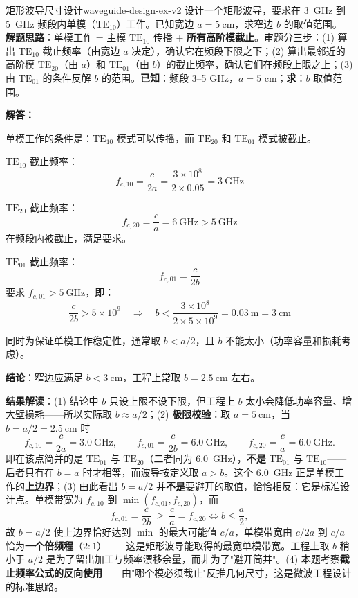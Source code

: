 \documentclass[11pt,a4paper,openany,oneside]{book}
\newcommand{\difficulty}[1]{\marginnote{\textcolor{red}{\textbf{[#1]}}}}
\begin{document}
\begin{example}{矩形波导尺寸设计}{waveguide-design-ex-v2}
\difficulty{提高}
设计一个矩形波导，要求在 \SI{3}{\giga\hertz} 到 \SI{5}{\giga\hertz} 频段内单模（$\text{TE}_{10}$）工作。已知宽边 $a = \SI{5}{\cm}$，求窄边 $b$ 的取值范围。
\tcblower
\textbf{解题思路}：单模工作 = 主模 $\text{TE}_{10}$ 传播 + \textbf{所有高阶模截止}。审题分三步：(1) 算出 $\text{TE}_{10}$ 截止频率（由宽边 $a$ 决定），确认它在频段下限之下；(2) 算出最邻近的高阶模 $\text{TE}_{20}$（由 $a$）和 $\text{TE}_{01}$（由 $b$）的截止频率，确认它们在频段上限之上；(3) 由 $\text{TE}_{01}$ 的条件反解 $b$ 的范围。\textbf{已知}：频段 3--5 GHz，$a = 5$ cm；\textbf{求}：$b$ 取值范围。

\textbf{解答：}

单模工作的条件是：$\text{TE}_{10}$ 模式可以传播，而 $\text{TE}_{20}$ 和 $\text{TE}_{01}$ 模式被截止。

$\text{TE}_{10}$ 截止频率：
\[
f_{c,10} = \frac{c}{2a} = \frac{3\times 10^8}{2\times 0.05} = \SI{3}{\giga\hertz}
\]

$\text{TE}_{20}$ 截止频率：
\[
f_{c,20} = \frac{c}{a} = \SI{6}{\giga\hertz} > \SI{5}{\giga\hertz}
\]
在频段内被截止，满足要求。

$\text{TE}_{01}$ 截止频率：
\[
f_{c,01} = \frac{c}{2b}
\]
要求 $f_{c,01} > \SI{5}{\giga\hertz}$，即：
\[
\frac{c}{2b} > 5\times 10^9 \quad\Rightarrow\quad b < \frac{3\times 10^8}{2\times 5\times 10^9} = \SI{0.03}{\m} = \SI{3}{\cm}
\]

同时为保证单模工作稳定性，通常取 $b < a/2$，且 $b$ 不能太小（功率容量和损耗考虑）。

\textbf{结论}：窄边应满足 $b < \SI{3}{\cm}$，工程上常取 $b = \SI{2.5}{\cm}$ 左右。

\textbf{结果解读}：(1) 结论中 $b$ 只设上限不设下限，但工程上 $b$ 太小会降低功率容量、增大壁损耗——所以实际取 $b\approx a/2$；(2) \textbf{极限校验}：取 $a=\SI{5}{\cm}$，当 $b = a/2 = \SI{2.5}{\cm}$ 时
\[
f_{c,10} = \frac{c}{2a} = \SI{3.0}{\GHz},\qquad
f_{c,01} = \frac{c}{2b} = \SI{6.0}{\GHz},\qquad
f_{c,20} = \frac{c}{a} = \SI{6.0}{\GHz}.
\]
即在该点简并的是 $\text{TE}_{01}$ 与 $\text{TE}_{20}$（二者同为 \SI{6.0}{\GHz}），\textbf{不是} $\text{TE}_{01}$ 与 $\text{TE}_{10}$——后者只有在 $b=a$ 时才相等，而波导按定义取 $a>b$。这个 \SI{6.0}{\GHz} 正是单模工作的\textbf{上边界}；(3) 由此看出 $b = a/2$ 并\textbf{不是}要避开的取值，恰恰相反：它是标准设计点。单模带宽为 $f_{c,10}$ 到 $\min(f_{c,01},f_{c,20})$，而
\[
f_{c,01}=\frac{c}{2b}\ \ge\ \frac{c}{a}=f_{c,20}
\iff b \le \frac{a}{2},
\]
故 $b = a/2$ 使上边界恰好达到 $\min$ 的最大可能值 $c/a$，单模带宽由 $c/2a$ 到 $c/a$ 恰为\textbf{一个倍频程}（$2:1$）——这是矩形波导能取得的最宽单模带宽。工程上取 $b$ 稍小于 $a/2$ 是为了留出加工与频率漂移余量，而非为了"避开简并"。(4) 本题考察\textbf{截止频率公式的反向使用}——由"哪个模必须截止"反推几何尺寸，这是微波工程设计的标准思路。


\end{example}
\end{document}
